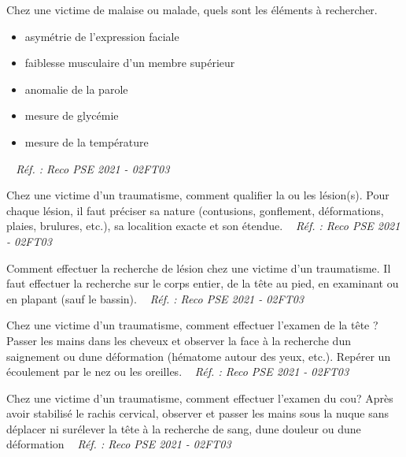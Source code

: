 \documentclass[grid,avery5371,landscape]{flashcards}
\makeatletter
\newcounter{nocarte}
\newcommand{\categ}[1]{%
  \def\@categ{#1}%
  \setcounter{nocarte}{0}%
}
\newcommand{\source}[1]{%
  \medskip
  \itshape%
   ~ \hfill Réf. : #1}
\makeatother
\begin{document}
\color[HTML]{003273}
\categ{PSE}
\begin{flashcard}[geste]{
 Chez une victime de malaise ou malade, quels sont les éléments à rechercher.   }
  \begin{itemize}
\item asymétrie de l'expression faciale
\item faiblesse musculaire d'un membre supérieur
\item anomalie de la parole
\item mesure de glycémie
\item mesure de la température
\end{itemize}

  \source{Reco PSE 2021 - 02FT03}
\end{flashcard}


\color[HTML]{003273}
\categ{PSE}
\begin{flashcard}[geste]{
 Chez une victime d'un traumatisme, comment qualifier la ou les lésion(s).   }
  Pour chaque lésion, il faut préciser sa nature (contusions, gonflement, déformations, plaies, brulures, etc.), sa localition exacte et son étendue.
  \source{Reco PSE 2021 - 02FT03}
\end{flashcard}


\color[HTML]{003273}
\categ{PSE}
\begin{flashcard}[geste]{
 Comment effectuer la recherche de lésion chez une victime d'un traumatisme.   }
  Il faut effectuer la recherche sur le corps entier, de la tête au pied, en examinant ou en plapant (sauf le bassin).
  \source{Reco PSE 2021 - 02FT03}
\end{flashcard}


\color[HTML]{003273}
\categ{PSE}
\begin{flashcard}[geste]{
 Chez une victime d'un traumatisme, comment effectuer l'examen de la tête ?   }
  Passer les mains dans les cheveux et observer la face à la recherche dun saignement ou dune déformation (hématome autour des yeux, etc.). Repérer un écoulement par le nez ou les oreilles.
  \source{Reco PSE 2021 - 02FT03}
\end{flashcard}


\color[HTML]{003273}
\categ{PSE}
\begin{flashcard}[geste]{
 Chez une victime d'un traumatisme, comment effectuer l'examen du cou?   }
  Après avoir stabilisé le rachis cervical, observer et passer les mains sous la nuque sans déplacer ni surélever la tête à la recherche de sang, dune douleur ou dune déformation
  \source{Reco PSE 2021 - 02FT03}
\end{flashcard}
\end{document}
